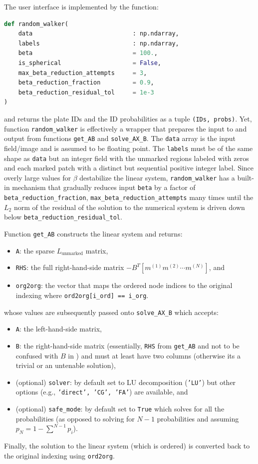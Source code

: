 \documentclass[12pt,letterpaper]{article}
\begin{document}
The user interface is implemented by the function:
\begin{lstlisting}[language=Python]
def random_walker(
    data                            : np.ndarray, 
    labels                          : np.ndarray,
    beta                            = 100.,
    is_spherical                    = False, 
    max_beta_reduction_attempts     = 3,
    beta_reduction_fraction         = 0.9,
    beta_reduction_residual_tol     = 1e-3
)
\end{lstlisting}
and returns the plate IDs and the ID probabilities as a tuple \texttt{(IDs, probs)}.
Yet, function \texttt{random\_walker} is effectively a wrapper that prepares the input
to and output from functions \texttt{get\_AB} and \texttt{solve\_AX\_B}. The \texttt{data}
array is the input field/image and is assumed to be floating point. The \texttt{labels} 
must be of the same shape as \texttt{data} but an integer field with the unmarked 
regions labeled with zeros and each marked patch with a distinct but sequential 
positive integer label. Since overly large values for $\beta$ destabilize the linear 
system, \texttt{random\_walker} has a built-in mechanism that gradually reduces input \texttt{beta}
by a factor of \texttt{beta\_reduction\_fraction}, \texttt{max\_beta\_reduction\_attempts}
many times until the $L_2$ norm of the residual of the solution to the numerical 
system is driven down below \texttt{beta\_reduction\_residual\_tol}.

Function \texttt{get\_AB} constructs the linear system and returns:
\begin{itemize}
    \item \texttt{A}: the sparse $L_{\mathrm{unmarked}}$ matrix,
    \item \texttt{RHS}: the full right-hand-side matrix $-B^T \left [m^{(1)} m^{(2)} \cdots m^{(N)} \right ]$, and
    \item \texttt{org2org}: the vector that maps the ordered node indices to the original indexing 
    where \texttt{ord2org[i\_ord] == i\_org}.
\end{itemize}
whose values are subsequently passed onto \texttt{solve\_AX\_B} which accepts:
\begin{itemize}
    \item \texttt{A}: the left-hand-side matrix,
    \item \texttt{B}: the right-hand-side matrix (essentially, \texttt{RHS} from \texttt{get\_AB} and not to be confused with $B$ in \cite{grady2006}) and must at least have two columns (otherwise its a trivial or an untenable solution), 
    \item (optional) \texttt{solver}: by default set to LU decomposition (\texttt{'LU'}) but other options (e.g., \texttt{'direct', 'CG', 'FA'}) are available, and
    \item (optional) \texttt{safe\_mode}: by default set to \texttt{True} which solves for all the probabilities (as opposed to solving for $N-1$ probabilities and assuming $p_N = 1 - \sum^{N-1} p_i$).
\end{itemize}
Finally, the solution to the linear system (which is ordered) is converted back to 
the original indexing using \texttt{ord2org}.
\end{document}
